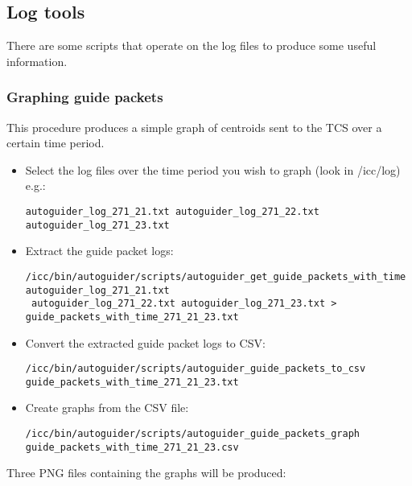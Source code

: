 \documentclass[10pt,a4paper]{article}
\begin{document}
\subsection{Log tools}

There are some scripts that operate on the log files to produce some useful information.

\subsubsection{Graphing guide packets}

This procedure produces a simple graph of centroids sent to the TCS over a certain time period.

\begin{itemize}

\item Select the log files over the time period you wish to graph (look in /icc/log) e.g.: 

\begin{verbatim}
autoguider_log_271_21.txt autoguider_log_271_22.txt autoguider_log_271_23.txt
\end{verbatim}

\item Extract the guide packet logs:

\begin{verbatim}
/icc/bin/autoguider/scripts/autoguider_get_guide_packets_with_time autoguider_log_271_21.txt
 autoguider_log_271_22.txt autoguider_log_271_23.txt > guide_packets_with_time_271_21_23.txt
\end{verbatim}

\item Convert the extracted guide packet logs to CSV:

\begin{verbatim}
/icc/bin/autoguider/scripts/autoguider_guide_packets_to_csv guide_packets_with_time_271_21_23.txt
\end{verbatim}

\item Create graphs from the CSV file:

\begin{verbatim}
/icc/bin/autoguider/scripts/autoguider_guide_packets_graph guide_packets_with_time_271_21_23.csv
\end{verbatim}

\end{itemize}

Three PNG files containing the graphs will be produced:
\end{document}
